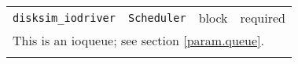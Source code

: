 \noindent 
\begin{tabular}{|p{\lpmodwidth}|p{\lpnamewidth}|p{0.5in}|p{0.5in}|}
\cline{1-4}
\texttt{disksim\_iodriver} & \texttt{Scheduler} & block & required \\ 
\cline{1-4}
\multicolumn{4}{|p{6in}|}{
This is an ioqueue; see section \ref{param.queue}.
}\\ 
\cline{1-4}
\multicolumn{4}{p{5in}}{}\\
\end{tabular}\\ 
